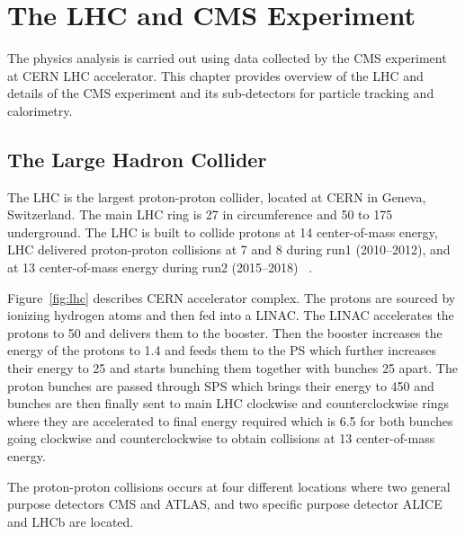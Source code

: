 \chapter{
  The LHC and CMS Experiment
 }\label{ch_cms}

The physics analysis is carried out using data collected by the \gls{CMS} experiment at
\gls{CERN} \gls{LHC} accelerator. This chapter provides overview of the \gls{LHC}
and details of the CMS experiment and its sub-detectors for particle tracking
and calorimetry.

\section{
  The Large Hadron Collider
 }\label{ch_cms:lhc}

The \gls{LHC} is the largest proton-proton
collider, located at
\gls{CERN} in Geneva, Switzerland.
The main \gls{LHC} ring is 27\km{} in circumference
and 50 to 175\m{} underground.
The \gls{LHC} is built to collide protons at 14\TeV{} center-of-mass energy,
LHC delivered proton-proton collisions at 7 and 8\TeV{}
during run1 (2010--2012), and at 13\TeV{} center-of-mass energy during
run2 (2015--2018)
~\cite{Evans:2008}.

Figure~\ref{fig:lhc} describes \gls{CERN} accelerator complex.
The protons are sourced by ionizing hydrogen atoms
and then fed into a \gls{LINAC}.
The \gls{LINAC} accelerates the protons to 50\MeV{} and delivers them to the booster.
Then the booster increases the energy of the protons to 1.4\GeV{} and
feeds them to the \gls{PS} which further increases their energy to 25\GeV{}
and starts bunching them together with bunches 25\nanoseconds{} apart.
The proton bunches are passed through \gls{SPS} which brings their energy
to 450\GeV{} and bunches are then finally sent to main \gls{LHC} clockwise and counterclockwise
rings where they are accelerated to final energy required which is 6.5\TeV{}
for both bunches going clockwise and counterclockwise
to obtain collisions at 13\TeV{} center-of-mass energy.

The proton-proton collisions occurs at four different locations where two
general purpose detectors \gls{CMS} and \gls{ATLAS}, and
two specific purpose detector \gls{ALICE} and \gls{LHCb} are located.

